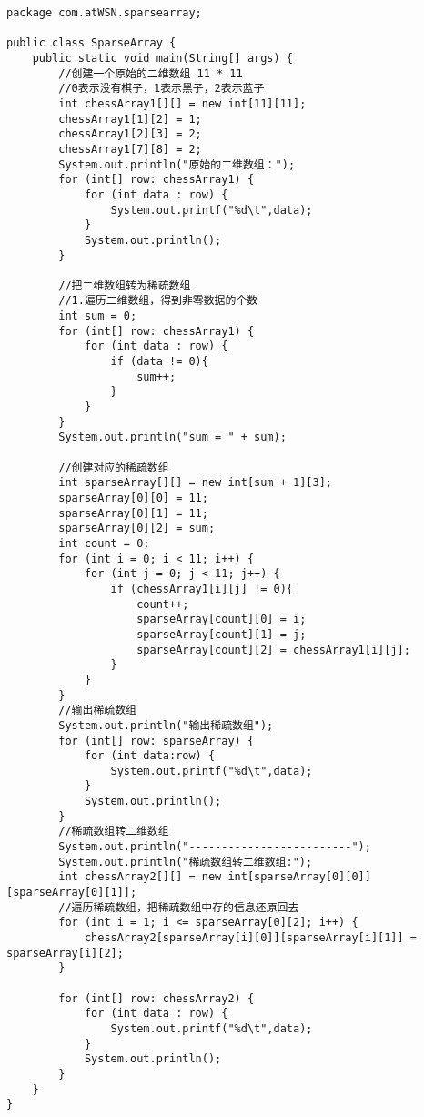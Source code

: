 \documentclass[a4paper]{report}
\begin{document}
\begin{lstlisting}
package com.atWSN.sparsearray;

public class SparseArray {
    public static void main(String[] args) {
        //创建一个原始的二维数组 11 * 11
        //0表示没有棋子，1表示黑子，2表示蓝子
        int chessArray1[][] = new int[11][11];
        chessArray1[1][2] = 1;
        chessArray1[2][3] = 2;
        chessArray1[7][8] = 2;
        System.out.println("原始的二维数组：");
        for (int[] row: chessArray1) {
            for (int data : row) {
                System.out.printf("%d\t",data);
            }
            System.out.println();
        }

        //把二维数组转为稀疏数组
        //1.遍历二维数组，得到非零数据的个数
        int sum = 0;
        for (int[] row: chessArray1) {
            for (int data : row) {
                if (data != 0){
                    sum++;
                }
            }
        }
        System.out.println("sum = " + sum);

        //创建对应的稀疏数组
        int sparseArray[][] = new int[sum + 1][3];
        sparseArray[0][0] = 11;
        sparseArray[0][1] = 11;
        sparseArray[0][2] = sum;
        int count = 0;
        for (int i = 0; i < 11; i++) {
            for (int j = 0; j < 11; j++) {
                if (chessArray1[i][j] != 0){
                    count++;
                    sparseArray[count][0] = i;
                    sparseArray[count][1] = j;
                    sparseArray[count][2] = chessArray1[i][j];
                }
            }
        }
        //输出稀疏数组
        System.out.println("输出稀疏数组");
        for (int[] row: sparseArray) {
            for (int data:row) {
                System.out.printf("%d\t",data);
            }
            System.out.println();
        }
        //稀疏数组转二维数组
        System.out.println("-------------------------");
        System.out.println("稀疏数组转二维数组:");
        int chessArray2[][] = new int[sparseArray[0][0]][sparseArray[0][1]];
        //遍历稀疏数组，把稀疏数组中存的信息还原回去
        for (int i = 1; i <= sparseArray[0][2]; i++) {
            chessArray2[sparseArray[i][0]][sparseArray[i][1]] = sparseArray[i][2];
        }

        for (int[] row: chessArray2) {
            for (int data : row) {
                System.out.printf("%d\t",data);
            }
            System.out.println();
        }
    }
}

\end{lstlisting}
\end{document}
